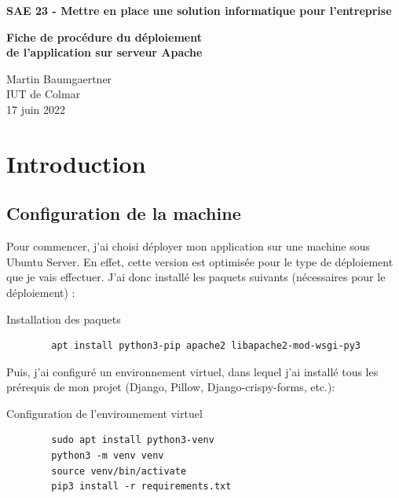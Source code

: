 \documentclass[12pt, a4paper]{article}
\begin{document}
\begin{titlepage}
    \begin{center}
        \vspace*{1cm}
 
        \textbf{\Large SAE 23 - Mettre en place une solution informatique pour l'entreprise}
 
      
             
        \vspace{6.5cm}
 
        \textbf{Fiche de procédure du déploiement\\
        de l'application sur serveur Apache}
 
        \vfill
             
       
             
        \vspace{3cm}
        Martin Baumgaertner\\
        IUT de Colmar\\
        17 juin 2022
    \end{center}
 \end{titlepage}
 \newpage
 \tableofcontents
 \listoflistings
 
 \newpage
 \section{Introduction}
    \subsection{Configuration de la machine}
    Pour commencer, j'ai choisi déployer mon application sur
    une machine sous Ubuntu Server. En effet, cette version est optimisée
    pour le type de déploiement que je vais effectuer. 
    J'ai donc installé les paquets suivants (nécessaires pour le déploiement) :
    \begin{listing}[H]
        \caption{Installation des paquets}
        \label{lst:paquets}
        \begin{verbatim}
        apt install python3-pip apache2 libapache2-mod-wsgi-py3
        \end{verbatim}
    \end{listing}
    Puis, j'ai configuré un environnement virtuel, dans lequel j'ai installé 
    tous les prérequis de mon projet (Django, Pillow, Django-crispy-forms, etc.):
    \begin{listing}[H]
        \caption{Configuration de l'environnement virtuel}
        \label{lst:environnement}
        \begin{verbatim}
        sudo apt install python3-venv
        python3 -m venv venv
        source venv/bin/activate
        pip3 install -r requirements.txt
        \end{verbatim}
    \end{listing}
\end{document}
